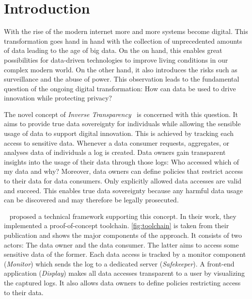 \documentclass[../main.tex]{subfiles}
\begin{document}
\chapter{Introduction}
With the rise of the modern internet more and more systems become digital.
This transformation goes hand in hand with the collection of unprecedented amounts of data leading to the age of big data.
On the on hand, this enables great possibilities for data-driven technologies to improve living conditions in our complex modern world.
On the other hand, it also introduces the risks such as surveillance and the abuse of power.
This observation leads to the fundamental question of the ongoing digital transformation: How can data be used to drive innovation while protecting privacy?~\cite{Boes2022, Schallmo2016}

The novel concept of \emph{Inverse Transparency}~\cite{Boes2022} is concerned with this question.
It aims to provide true data sovereignty for individuals while allowing the sensible usage of data to support digital innovation.
This is achieved by tracking each access to sensitive data.
Whenever a data consumer requests, aggregates, or analyses data of individuals a log is created.
Data owners gain transparent insights into the usage of their data through those logs:
Who accessed which of my data and why?
Moreover, data owners can define policies that restrict access to their data for data consumers.
Only explicitly allowed data accesses are valid and succeed.
This enables true data sovereignty because any harmful data usage can be discovered and may therefore be legally prosecuted.

\citeauthor{Zieglmeier2021}~\cite{Zieglmeier2021} proposed a technical framework supporting this concept.
In their work, they implemented a proof-of-concept toolchain.
\cref{fig:toolchain} is taken from their publication and shows the major components of the approach.
It consists of two actors: The data owner and the data consumer.
The latter aims to access some sensitive data of the former.
Each data access is tracked by a monitor component (\emph{Monitor}) which sends the log to a dedicated server (\emph{Safekeeper}).
A front-end application (\emph{Display}) makes all data accesses transparent to a user by visualizing the captured logs.
It also allows data owners to define policies restricting access to their data.
\end{document}
